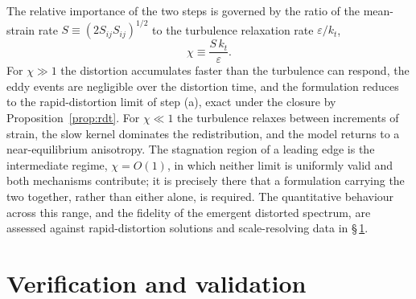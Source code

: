 \documentclass[lineno]{JFM-FLM_Au}
\begin{document}
The relative importance of the two steps is governed by the ratio of the
mean-strain rate $S\equiv(2S_{ij}S_{ij})^{1/2}$ to the turbulence
relaxation rate $\varepsilon/k_t$,
\begin{equation}
  \chi \equiv \frac{S\,k_t}{\varepsilon}.
  \label{eq:chi}
\end{equation}
For $\chi\gg1$ the distortion accumulates faster than the turbulence can
respond, the eddy events are negligible over the distortion time, and the
formulation reduces to the rapid-distortion limit of step (a), exact under
the closure by Proposition~\ref{prop:rdt}. For $\chi\ll1$ the turbulence
relaxes between increments of strain, the slow kernel dominates the
redistribution, and the model returns to a near-equilibrium anisotropy. The
stagnation region of a leading edge is the intermediate regime, $\chi=
O(1)$, in which neither limit is uniformly valid and both mechanisms
contribute; it is precisely there that a formulation carrying the two
together, rather than either alone, is required. The quantitative behaviour
across this range, and the fidelity of the emergent distorted spectrum, are
assessed against rapid-distortion solutions and scale-resolving data in
\S\,\ref{sec:validation}.

%
%

\section{Verification and validation}\label{sec:validation}
\end{document}
